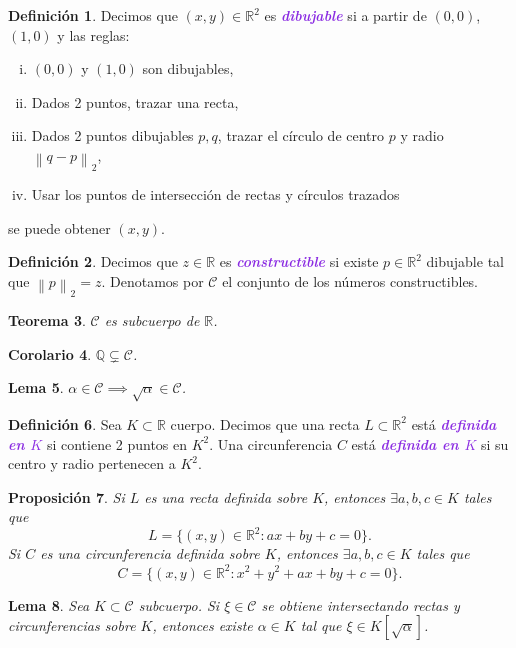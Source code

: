 \documentclass{article}
\newtheorem{theorem}{Teorema}[subsection]
\newtheorem{corollary}[theorem]{Corolario}
\newtheorem{proposition}[theorem]{Proposición}
\newtheorem{lemma}[theorem]{Lema}
\theoremstyle{definition}
\newtheorem{definition}[theorem]{Definición}
\theoremstyle{remark}
\numberwithin{equation}{section}
\newcommand{\Q}{\mathbb{Q}}
\newcommand{\R}{\mathbb{R}}
\newcommand{\Ccal}{\mathcal{C}}
\renewcommand{\a}{\alpha}
\newcommand{\norm}[1]{\left\lVert #1 \right\rVert}
\newcommand{\wea}[1]{\textcolor{BlueViolet}{\textbf{\emph{#1}}}}
\begin{document}
\begin{definition}
  Decimos que $(x,y) \in \R^2$ es \wea{dibujable} si a partir de $(0,0)$, $(1,0)$ y las reglas:
  \begin{enumerate}[(i)]
    \item $(0,0)$ y $(1,0)$ son dibujables,
    \item Dados 2 puntos, trazar una recta,
    \item Dados 2 puntos dibujables $p,q$, trazar el círculo de centro $p$ y radio $\norm{q-p}_2$,
    \item Usar los puntos de intersección de rectas y círculos trazados
  \end{enumerate}
  se puede obtener $(x,y)$.
\end{definition}

\begin{definition}
  Decimos que $z \in \R$ es \wea{constructible} si existe $p \in \R^2$ dibujable tal que $\norm{p}_2 = z$. Denotamos por $\Ccal$ el conjunto de los números constructibles.
\end{definition}

\begin{theorem}
  $\Ccal$ es subcuerpo de $\R$.
\end{theorem}

\begin{corollary}
  $\Q \subsetneq \Ccal$.
\end{corollary}

\begin{lemma}
  $\a \in \Ccal \implies \sqrt\a \in \Ccal$.
\end{lemma}

\begin{definition}
  Sea $K \subset \R$ cuerpo. Decimos que una recta $L \subset \R^2$ está \wea{definida en $K$} si contiene 2 puntos en $K^2$. Una circunferencia $C$ está \wea{definida en $K$} si su centro y radio pertenecen a $K^2$.
\end{definition}

\begin{proposition}
  Si $L$ es una recta definida sobre $K$, entonces $\exists a,b,c \in K$ tales que
  \[ L = \{(x,y) \in \R^2 : ax+by+c=0\}. \]
  Si $C$ es una circunferencia definida sobre $K$, entonces $\exists a,b,c \in K$ tales que
  \[ C = \{(x,y) \in \R^2 : x^2 + y^2 + ax + by + c = 0\}. \]
\end{proposition}

\begin{lemma}
  Sea $K \subset \Ccal$ subcuerpo. Si $\xi \in \Ccal$ se obtiene intersectando rectas y circunferencias sobre $K$, entonces existe $\a \in K$ tal que $\xi \in K[\sqrt\a]$.
\end{lemma}
\end{document}
